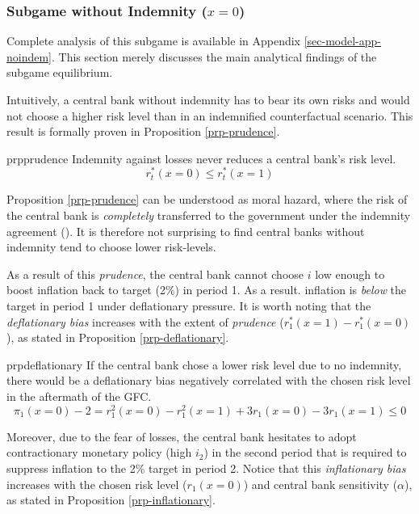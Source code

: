 \documentclass[
  a4paper,
  abstract=true]{scrartcl}
\theoremstyle{definition}
\begin{document}
\subsubsection{\texorpdfstring{Subgame without Indemnity
(\(x=0\))}{Subgame without Indemnity (x=0)}}\label{subgame-without-indemnity-x0}

Complete analysis of this subgame is available in Appendix
\ref{sec-model-app-noindem}. This section merely discusses the main
analytical findings of the subgame equilibrium.

Intuitively, a central bank without indemnity has to bear its own risks
and would not choose a higher risk level than in an indemnified
counterfactual scenario. This result is formally proven in Proposition
\ref{prp-prudence}.

\begin{restatable}{prp}{prudence}
\label{prp-prudence}
Indemnity against losses never reduces a central bank's risk level.
$$
r^*_t(x=0)\leq r^*_t(x=1)
$$
\end{restatable}

Proposition \ref{prp-prudence} can be understood as moral hazard, where
the risk of the central bank is \emph{completely} transferred to the
government under the indemnity agreement
(). It is therefore not
surprising to find central banks without indemnity tend to choose lower
risk-levels.

As a result of this \emph{prudence}, the central bank cannot choose
\(i\) low enough to boost inflation back to target (2\%) in period 1. As
a result. inflation is \emph{below} the target in period 1 under
deflationary pressure. It is worth noting that the \emph{deflationary
bias} increases with the extent of \emph{prudence}
(\(r^*_1(x=1)-r_1^*(x=0)\)), as stated in Proposition
\ref{prp-deflationary}.

\begin{restatable}{prp}{deflationary}
\label{prp-deflationary}
If the central bank chose a lower risk level due to no indemnity, there would be a deflationary bias negatively correlated with the chosen risk level in the aftermath of the GFC.
$$
\pi_1(x=0)-2=r_1^{2}(x=0)-r_1^{2}(x=1)+3r_1(x=0)-3r_1(x=1)\leq0
$$
\end{restatable}

Moreover, due to the fear of losses, the central bank hesitates to adopt
contractionary monetary policy (high \(i_2\)) in the second period that
is required to suppress inflation to the 2\% target in period 2. Notice
that this \emph{inflationary bias} increases with the chosen risk level
(\(r_1(x=0)\)) and central bank sensitivity (\(\alpha\)), as stated in
Proposition \ref{prp-inflationary}.
\end{document}
